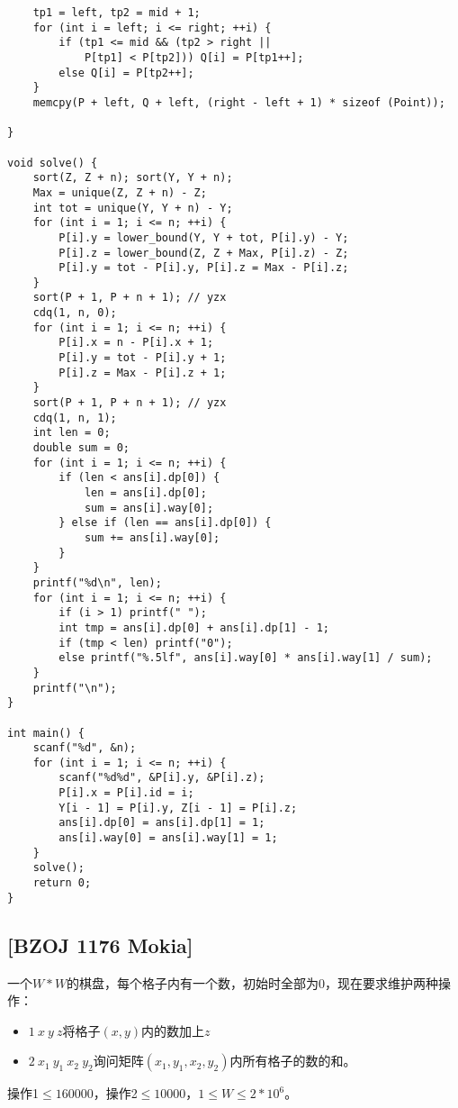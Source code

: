 \begin{lstlisting}
	tp1 = left, tp2 = mid + 1;
	for (int i = left; i <= right; ++i) {
		if (tp1 <= mid && (tp2 > right ||
			P[tp1] < P[tp2])) Q[i] = P[tp1++];
	   	else Q[i] = P[tp2++];	
	}
	memcpy(P + left, Q + left, (right - left + 1) * sizeof (Point));
	
}

void solve() {
	sort(Z, Z + n); sort(Y, Y + n);
	Max = unique(Z, Z + n) - Z;
	int tot = unique(Y, Y + n) - Y;
	for (int i = 1; i <= n; ++i) {
		P[i].y = lower_bound(Y, Y + tot, P[i].y) - Y;
		P[i].z = lower_bound(Z, Z + Max, P[i].z) - Z;
		P[i].y = tot - P[i].y, P[i].z = Max - P[i].z;
	}
	sort(P + 1, P + n + 1); // yzx
	cdq(1, n, 0);
	for (int i = 1; i <= n; ++i) {
		P[i].x = n - P[i].x + 1;
		P[i].y = tot - P[i].y + 1;
		P[i].z = Max - P[i].z + 1;
	}
	sort(P + 1, P + n + 1); // yzx
	cdq(1, n, 1);
	int len = 0;
	double sum = 0;
	for (int i = 1; i <= n; ++i) {
		if (len < ans[i].dp[0]) {
			len = ans[i].dp[0];
			sum = ans[i].way[0];
		} else if (len == ans[i].dp[0]) {
			sum += ans[i].way[0];
		}
	}
	printf("%d\n", len);
	for (int i = 1; i <= n; ++i) {
		if (i > 1) printf(" ");
		int tmp = ans[i].dp[0] + ans[i].dp[1] - 1;
		if (tmp < len) printf("0");
		else printf("%.5lf", ans[i].way[0] * ans[i].way[1] / sum);
	}
	printf("\n");
}

int main() {
	scanf("%d", &n);
	for (int i = 1; i <= n; ++i) {
		scanf("%d%d", &P[i].y, &P[i].z);
		P[i].x = P[i].id = i;
		Y[i - 1] = P[i].y, Z[i - 1] = P[i].z;
		ans[i].dp[0] = ans[i].dp[1] = 1;
		ans[i].way[0] = ans[i].way[1] = 1;
	}
	solve();
	return 0;
}
\end{lstlisting}
\subsection{[BZOJ 1176 Mokia]}
一个$W*W$的棋盘，每个格子内有一个数，初始时全部为0，现在要求维护两种操作：
\begin{itemize}
\item $1\ x\ y\ z$将格子$(x,y)$内的数加上$z$
\item $2\ x_1\ y_1\ x_2\ y_2$询问矩阵$(x_1,y_1,x_2,y_2)$内所有格子的数的和。
\end{itemize}
操作1$\leq 160000$，操作2$\leq 10000$，$1\leq W\leq 2*10^6$。\\


